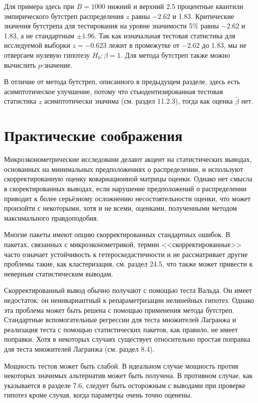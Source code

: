 Для примера здесь при $B = 1 000$ нижний и верхний 2.5 процентные квантили эмпирического бутстреп распределения  $z$ равны $- 2.62$ и 1.83. Критические значения бутстрепа для тестирования на уровне значимости 5\% равны $- 2.62$ и 1.83, а не стандартным $\pm 1.96$. Так как изначальная тестовая статистика для исследуемой выборки $z = - 0.623$ лежит в промежутке от $- 2.62$ до 1.83, мы не отвергаем нулевую гипотезу $H_0: \beta = 1$. Для метода  
бутстреп также можно вычислить $p$-значение.

В отличие от метода бутстреп, описанного в предыдущем разделе, здесь есть асимптотическое улучшение, потому что стьюдентизированная тестовая статистика $z$ асимптотически значима (см. раздел 11.2.3), тогда как оценка $\hat{\beta}$ нет.

\section{Практические соображения}

Микроэконометрические исследовани делают акцент на статистических выводах, основанных на минимальных предположениях о распределении, и используют скорректированную оценку ковариационной матрицы оценки. Однако нет смысла в скоректированных выводах, если нарушение предположений о распределении приводит к более серьёзному осложнению несостоятельности оценки, что может произойти с некоторыми, хотя и не всеми, оценками, полученными методом максимального правдоподобия.

Многие пакеты имеют опцию скорректированных стандартных ошибок. В пакетах, связанных с микроэконометрикой, термин <<скорректированные>> часто означает устойчивость к гетероскедастичности и не рассматривает другие проблемы такие, как кластеризация, см. раздел 24.5, что также может привести к неверным статистическим выводам.

Скорректированный вывод обычно получают с помощью теста Вальда. Он имеет недостаток: он неинвариантный к репараметризации нелинейных гипотез. Однако эта проблема может быть решена с помощью применения метода бутстреп. Стандартные вспомогательные регрессии для теста множителей Лагранжа и реализация теста с помощью статистических пакетов, как правило, не имеет поправки. Хотя в некоторых случаях существует относительно простая поправка для теста множителей Лагранжа (см. раздел 8.4).

Мощность тестов может быть слабой. В идеальном случае мощность против некоторых значимых альтернатив может быть получена. В противном случае, как указывается в разделе 7.6, следует быть осторожным с выводами при проверке гипотез кроме случая, когда параметры очень точно оценены.

